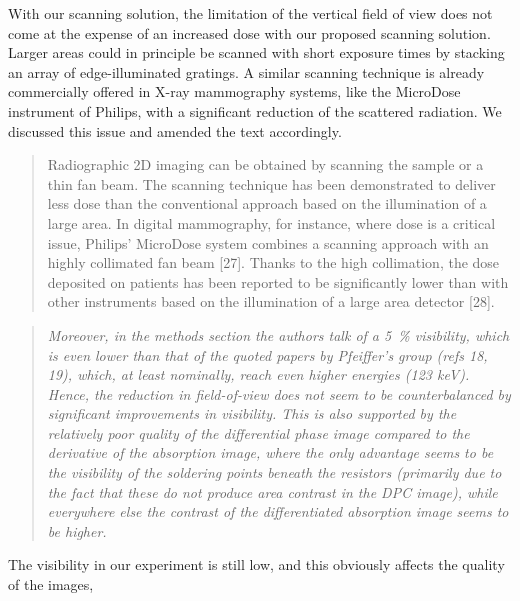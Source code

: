 \documentclass[a4paper,english]{scrartcl}
\newenvironment{reviewerquote}{\begin{quote}\itshape}{\end{quote}}
\begin{document}
With our scanning solution, the limitation of the vertical field of view does not come at the expense of
an increased dose with our proposed scanning solution. Larger areas could in
principle be scanned with short exposure times by stacking an array of
edge-illuminated gratings. 
A similar scanning technique is already commercially offered in X-ray
mammography systems, like the MicroDose instrument of Philips, with a
significant reduction of the scattered radiation. We discussed this issue and
amended the text accordingly.
\begin{quote}
 Radiographic 2D imaging can be obtained by scanning the sample or a
thin fan beam. The scanning technique has been demonstrated to deliver less dose than the
conventional approach based on the illumination of a large area. In digital mammography,
for instance, where dose is a critical issue, Philips’ MicroDose system combines a scanning
approach with an highly collimated fan beam [27]. Thanks to the high collimation, the dose
deposited on patients has been reported to be significantly lower than with other instruments
based on the illumination of a large area detector [28]. 
\end{quote}

\begin{reviewerquote}
    Moreover, in the methods section the authors talk of a
    \SI{5}{\percent} visibility, which is even lower than that of the quoted papers by Pfeiffer's group (refs 18, 19), which, at least nominally, reach even higher energies (123 keV). Hence, the reduction in field-of-view does not seem to be counterbalanced by significant improvements in visibility. This is also supported by the relatively poor quality of the differential phase image compared to the derivative of the absorption image, where the only advantage seems to be the visibility of the soldering points beneath the resistors (primarily due to the fact that these do not produce area contrast in the DPC image), while everywhere else the contrast of the differentiated absorption image seems to be higher.
\end{reviewerquote}
The visibility in our experiment is still low, and this obviously
affects the quality of the images, 
\end{document}
